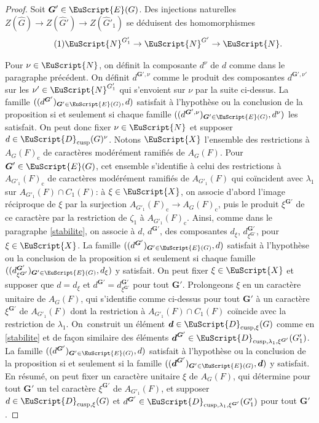 \documentclass[JEP,XML,SOM,Unicode,francais]{cedram}
\let\mathcal \EuScript
\newcommand{\rc}{\mathrm{c}}
\newcommand{\cusp}{\mathrm{cusp}}
\newcommand{\bmd}{\boldsymbol{d}}
\newcommand{\bG}{\boldsymbol{G}}
\newcommand{\cD}{\mathcal{D}}
\newcommand{\cE}{\mathcal{E}}
\newcommand{\cN}{\mathcal{N}}
\newcommand{\cX}{\mathcal{X}}
\theoremstyle{plain}
\theoremstyle{definition}
\begin{document}
\begin{proof}
Soit $\bG'\in \cE(G)$. Des injections naturelles $Z(\hat{G})\to Z(\hat{G}')\to Z(\hat{G}'_{1})$ se déduisent des homomorphismes\vspace*{-3pt}
\begin{equation}\tag{1}\label{finale1}
\cN^{G'_{1}}\to \cN^{G'}\to \cN.
\end{equation}

Pour $\nu\in \cN$, on définit la composante $d^{\nu}$ de $d$ comme dans le paragraphe précédent. On définit $d^{\bG',\nu}$ comme le produit des composantes $d^{\bG',\nu'}$ sur les $\nu'\in \cN^{G'_{1}}$ qui s'envoient sur $\nu$ par la suite ci-dessus. La famille $((d^{\bG'})_{\bG'\in \cE(G)},d)$ satisfait à l'hypothèse ou la conclusion de la proposition si et seulement si chaque famille $((d^{\bG',\nu})_{\bG'\in \cE(G)},d^{\nu})$ les satisfait. On peut donc fixer $\nu\in \cN$ et supposer $d\in \cD_{\cusp}(G)^{\nu}$. Notons $\cX$ l'ensemble des restrictions à $A_{G}(F)_{\rc}$ de caractères modérément ramifiés de $A_{G}(F)$. Pour $\bG'\in \cE(G)$, cet ensemble s'identifie à celui des restrictions à $A_{G'_{1}}(F)_{\rc}$ de caractères modérément ramifiés de $A_{G'_{1}}(F)$ qui coïncident avec $\lambda_{1}$ sur $A_{G'_{1}}(F)\cap C_{1}(F)$: à $\xi\in \cX$, on associe d'abord l'image réciproque de $\xi$ par la surjection $A_{G'_{1}}(F)_{\rc}\to A_{G}(F)_{\rc}$, puis le produit $\xi^{\bG'}$ de ce caractère par la restriction de $\zeta_{1}$ à $A_{G'_{1}}(F)_{\rc}$. Ainsi, comme dans le paragraphe \ref{stabilite}, on associe à $d$, \resp $d^{\bG'}$, des composantes $d_{\xi}$, \resp $d^{\bG'}_{\xi^{\bG'}}$, pour $\xi\in \cX$. La famille $((d^{\bG'})_{\bG'\in \cE(G)},d)$ satisfait à l'hypothèse ou la conclusion de la proposition si et seulement si chaque famille $((d^{\bG'}_{\xi^{\bG'}})_{\bG'\in \cE(G)},d_{\xi})$ y satisfait. On peut fixer $\xi\in \cX$ et supposer que $d=d_{\xi}$ et $d^{\bG'}=d^{\bG'}_{\xi^{\bG'}}$ pour tout $\bG'$. Prolongeons $\xi$ en un caractère unitaire de $A_{G}(F)$, qui s'identifie comme ci-dessus pour tout $\bG'$ à un caractère $\xi^{\bG'}$ de $A_{G'_{1}}(F)$ dont la restriction à $A_{G'_{1}}(F)\cap C_{1}(F)$ coïncide avec la restriction de $\lambda_{1}$. On~construit un élément $\bmd\in \cD_{\cusp,\xi}(G)$ comme en \ref{stabilite} et de façon similaire des éléments $\bmd^{\bG'}\in \cD_{\cusp,\lambda_{1},\xi^{\bG'}}(G'_{1})$. La famille $((d^{\bG'})_{\bG'\in \cE(G)},d)$ satisfait à l'hypothèse ou la conclusion de la proposition si et seulement si la famille $((\bmd^{\bG'})_{\bG'\in \cE(G)},\bmd)$ y satisfait. En résumé, on peut fixer un caractère unitaire $\xi$ de $A_{G}(F)$, qui détermine pour tout $\bG'$ un tel caractère $\xi^{\bG'}$ de $A_{G'_{1}}(F)$, et supposer $d\in \cD_{\cusp,\xi}(G)$ et $d^{\bG'}\in \cD_{\cusp,\lambda_{1},\xi^{\bG'}}(G'_{1})$ pour tout $\bG'$.


\end{proof}
\end{document}
